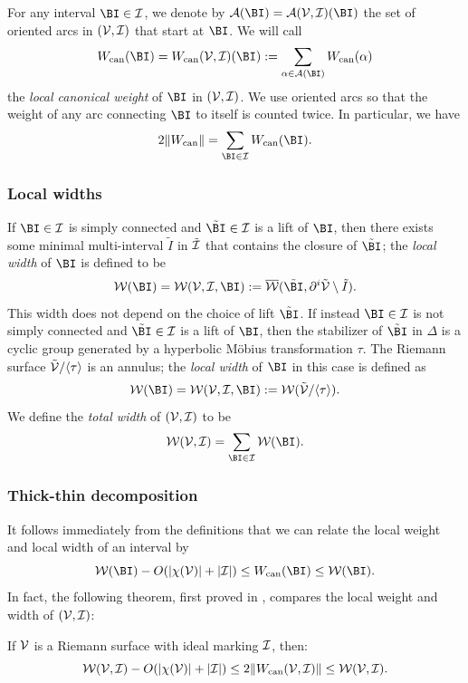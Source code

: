 \documentclass[12pt]{amsart}
\begin{document}
For any interval $\BI\in \II$, we denote by $\AA(\BI)= \AA(\VV, \II)( \BI)$ the set of oriented arcs in $(\mathcal V, \mathcal I)$ that start at $\BI$. 
We will call  
$$
\wcan(\BI)= \wcan(\VV, \II)(\BI):=\sum_{\alpha\in \AA(\BI)}\wcan(\alpha)
$$
the \textit{local canonical weight} of $\BI$ in $(\mathcal V, \mathcal I)$.
We use oriented arcs so that the weight of any arc connecting $\BI$ to itself is counted twice. In particular, we have 
$$2\|\wcan\| = \sum_{\BI\in \II}\wcan(\BI).$$

\subsubsection{Local widths}

If  $\BI\in \II$ is simply connected and $\tilde \BI\in \II$ is a lift of $\BI$, then there exists some minimal multi-interval $\tilde I$ in $\tilde {\mathcal I}$ that contains the closure of $\tilde \BI$; the \textit{local width} of $\BI$ is defined to be $$\WW(\BI)= \WW(\VV, \II, \BI):= \overline{\WW}(\tilde \BI, \ddi \tilde \VV\sm \tilde I).$$
This width does not depend on the choice of lift $\tilde \BI$. 
If instead $\BI\in \II$ is not simply connected and $\tilde \BI\in \II$ is a lift of $\BI$, then the stabilizer of $\tilde \BI$ in $\Delta$ is a cyclic group generated by a hyperbolic M\"obius transformation $\tau$. The Riemann surface $\tilde {\mathcal V}/\langle \tau \rangle$ is an annulus; the \textit{local width} of $\BI$ in this case is defined as 
$$\WW(\BI)= \WW(\VV, \II, \BI):= \WW(\tilde \VV/\langle \tau \rangle).$$
We define the \textit{total width} of $(\mathcal V, \mathcal I)$ to be 
$$\WW(\VV, \II)= \sum_{\BI\in \II}\WW(\BI).$$

\subsubsection{Thick-thin decomposition}
It follows immediately from the definitions that we can relate the local weight and local width of an interval by
\begin{equation}\label{eq:total width vs total weight single}
	\WW(\BI) - O(|\chi(\VV)|+ |\II|) \leq \wcan(\BI)\leq \WW(\BI).
\end{equation}
In fact, the following theorem, first proved in \cite{KL:eyes}, compares the local weight and width of $(\mathcal V, \mathcal I)$:
\begin{theorem}\label{main estimate} 
	If $\mathcal V$ is a Riemann surface with ideal marking 
	$\mathcal I$, then:
	\begin{equation}\label{eq:thick-thin}
		\mathcal W(\mathcal V, \mathcal I)- O(|\chi(\mathcal V)|+ |\mathcal I|) \leq 2\|W_{\operatorname{can}}(\mathcal V, \mathcal I)\|\leq \mathcal W(\mathcal V, \mathcal I).
	\end{equation}
\end{theorem}  
\end{document}
